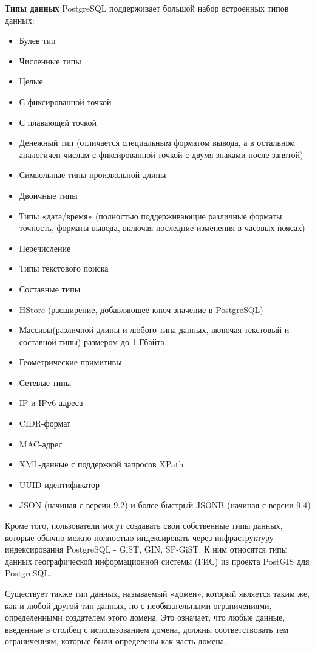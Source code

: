 \textbf{Типы данных} 
PostgreSQL поддерживает большой набор встроенных типов данных:
\begin{itemize}
  \item Булев тип
  \item Численные типы
  \item Целые
  \item С фиксированной точкой
  \item С плавающей точкой
  \item Денежный тип (отличается специальным форматом вывода, а в остальном аналогичен числам с фиксированной точкой с двумя знаками после запятой)
  \item Символьные типы произвольной длины
  \item Двоичные типы
  \item Типы «дата/время» (полностью поддерживающие различные форматы, точность, форматы вывода, включая последние изменения в часовых поясах)
  \item Перечисление
  \item Типы текстового поиска
  \item Составные типы
  \item HStore (расширение, добавляющее ключ-значение в PostgreSQL)
  \item Массивы(различной длины и любого типа данных, включая текстовый и составной типы) размером до 1 Гбайта
  \item Геометрические примитивы
  \item Сетевые типы
  \item IP и IPv6-адреса
  \item CIDR-формат
  \item MAC-адрес
  \item XML-данные с поддержкой запросов XPath
  \item UUID-идентификатор
  \item JSON (начиная с версии 9.2) и более быстрый JSONB (начиная с версии 9.4)
\end{itemize}
Кроме того, пользователи могут создавать свои собственные типы данных, которые обычно можно полностью индексировать через инфраструктуру индексирования PostgreSQL - GiST, GIN, SP-GiST. К ним относятся типы данных географической информационной системы (ГИС) из проекта PostGIS для PostgreSQL.

Существует также тип данных, называемый «домен», который является таким же, как и любой другой тип данных, но с необязательными ограничениями, определенными создателем этого домена. Это означает, что любые данные, введенные в столбец с использованием домена, должны соответствовать тем ограничениям, которые были определены как часть домена.

